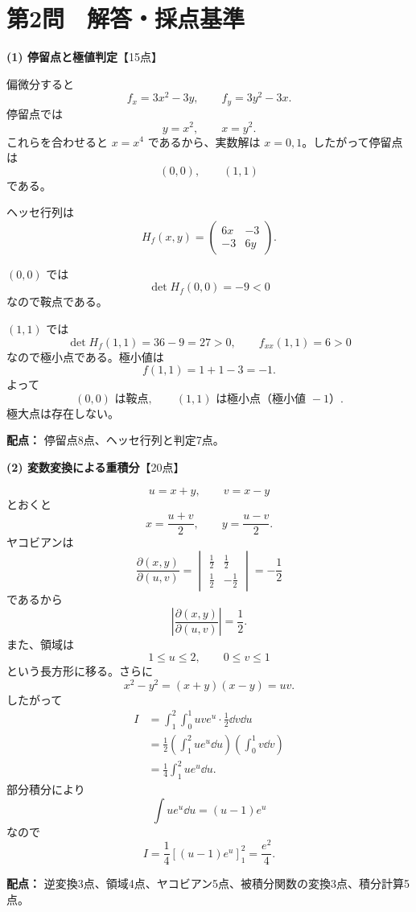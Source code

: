 \section*{第2問　解答・採点基準 }
\begin{solutionbox}
\textbf{(1) 停留点と極値判定}\hfill【15点】

偏微分すると
\[
f_x=3x^2-3y,\qquad f_y=3y^2-3x.
\]
停留点では
\[
y=x^2,\qquad x=y^2.
\]
これらを合わせると $x=x^4$ であるから、実数解は $x=0,1$。したがって停留点は
\[
(0,0),\qquad (1,1)
\]
である。

ヘッセ行列は
\[
H_f(x,y)=\begin{pmatrix}
6x&-3\\
-3&6y
\end{pmatrix}.
\]

$(0,0)$ では
\[
\det H_f(0,0)=-9<0
\]
なので鞍点である。

$(1,1)$ では
\[
\det H_f(1,1)=36-9=27>0,\qquad f_{xx}(1,1)=6>0
\]
なので極小点である。極小値は
\[
f(1,1)=1+1-3=-1.
\]
よって
\[
\boxed{(0,0)\text{ は鞍点},\qquad (1,1)\text{ は極小点（極小値 }-1\text{）}}.
\]
極大点は存在しない。

\textbf{配点：} 停留点8点、ヘッセ行列と判定7点。
\end{solutionbox}

\begin{solutionbox}
\textbf{(2) 変数変換による重積分}\hfill【20点】

\[
u=x+y,\qquad v=x-y
\]
とおくと
\[
x=\frac{u+v}{2},\qquad y=\frac{u-v}{2}.
\]
ヤコビアンは
\[
\frac{\partial(x,y)}{\partial(u,v)}=
\begin{vmatrix}
\frac12&\frac12\\[1mm]
\frac12&-\frac12
\end{vmatrix}=-\frac12
\]
であるから
\[
\left|\frac{\partial(x,y)}{\partial(u,v)}\right|=\frac12.
\]
また、領域は
\[
1\le u\le2,\qquad 0\le v\le1
\]
という長方形に移る。さらに
\[
x^2-y^2=(x+y)(x-y)=uv.
\]
したがって
\begin{align*}
I&=\int_1^2\int_0^1 uv e^u\cdot\frac12\dd v\dd u\\
&=\frac12\left(\int_1^2u e^u\dd u\right)
\left(\int_0^1v\dd v\right)\\
&=\frac14\int_1^2u e^u\dd u.
\end{align*}
部分積分により
\[
\int u e^u\dd u=(u-1)e^u
\]
なので
\[
I=\frac14\left[(u-1)e^u\right]_1^2
=\boxed{\frac{e^2}{4}}.
\]

\textbf{配点：} 逆変換3点、領域4点、ヤコビアン5点、被積分関数の変換3点、積分計算5点。
\end{solutionbox}

